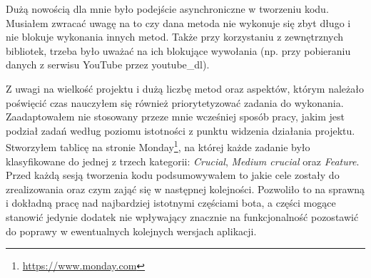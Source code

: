 \documentclass[shortabstract,inz]{iithesis}
\begin{document}
	 	Dużą nowością dla mnie było podejście asynchroniczne w tworzeniu kodu. Musiałem zwracać uwagę na to czy dana metoda nie wykonuje się zbyt długo i nie blokuje wykonania innych metod. Także przy korzystaniu z zewnętrznych bibliotek, trzeba było uważać na ich blokujące wywołania (np. przy pobieraniu danych z serwisu YouTube przez youtube\_dl).
	 	
	 	Z uwagi na wielkość projektu i dużą liczbę metod oraz aspektów, którym należało poświęcić czas nauczyłem się również priorytetyzować zadania do wykonania. Zaadaptowałem nie stosowany przeze mnie wcześniej sposób pracy, jakim jest podział zadań według poziomu istotności z punktu widzenia działania projektu. Stworzyłem tablicę na stronie Monday\footnote{\url{https://www.monday.com}}, na której każde zadanie było klasyfikowane do jednej z trzech kategorii: \textit{Crucial}, \textit{Medium crucial} oraz \textit{Feature}. Przed każdą sesją tworzenia kodu podsumowywałem to jakie cele zostały do zrealizowania oraz czym zająć się w następnej kolejności. Pozwoliło to na sprawną i dokładną pracę nad najbardziej istotnymi częściami bota, a części mogące stanowić jedynie dodatek nie wpływający znacznie na funkcjonalność pozostawić do poprawy w ewentualnych kolejnych wersjach aplikacji.
	 
	\setcounter{tocdepth}{1}
	\listoffigures
	\lstlistoflistings	
	\printbibliography[title=Bibliografia]
\end{document}
